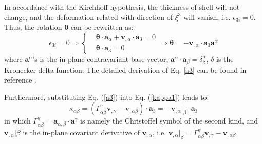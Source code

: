 In accordance with the Kirchhoff hypothesis, the thickness of shell will not change, and the deformation related with direction of $\xi^3$ will vanish, i.e. $\epsilon_{3i}=0$. Thus, the rotation $\boldsymbol \theta$ can be rewritten as:
\begin{equation}\label{a3}
\epsilon_{3i} = 0 \Rightarrow
\left \{
\begin{split}
&\boldsymbol \theta \cdot \boldsymbol a_\alpha + \boldsymbol v_{,\alpha} \cdot \boldsymbol a_3 = 0 \\
&\boldsymbol \theta \cdot \boldsymbol a_3 = 0
\end{split}
\right .
\Rightarrow \boldsymbol \theta = - \boldsymbol v_{,\alpha} \cdot \boldsymbol a_3 \boldsymbol a^\alpha
\end{equation}
where $\boldsymbol a^\alpha$'s is the in-plane contravariant base vector, $\boldsymbol a^\alpha \cdot \boldsymbol a_\beta = \delta^\alpha_\beta$, $\delta$ is the Kronecker delta function. The detailed derivation of Eq. \ref{a3} can be found in reference \cite{benzaken2021}.

Furthermore, substituting Eq. (\ref{a3}) into Eq. (\ref{kappa1}) leads to:
\begin{equation}
\kappa_{\alpha\beta} = (\Gamma^\gamma_{\alpha\beta} \boldsymbol v_{,\gamma} - \boldsymbol v_{,\alpha\beta}) \cdot \boldsymbol a_3 = - \boldsymbol v_{,\alpha}\vert_\beta \cdot \boldsymbol a_3
\end{equation}
in which $\Gamma^\gamma_{\alpha\beta} = \boldsymbol a_{\alpha,\beta} \cdot \boldsymbol a^\gamma$ is namely the Christoffel symbol of the second kind, and $\boldsymbol v_{,\alpha}\vert\beta$ is the in-plane covariant derivative of $\boldsymbol v_{,\alpha}$, i.e. $\boldsymbol v_{,\alpha}\vert_\beta = \Gamma^\gamma_{\alpha\beta}\boldsymbol v_{,\gamma} - \boldsymbol v_{,\alpha\beta}$.

